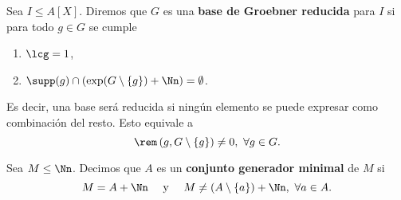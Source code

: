 \begin{definicion}
    Sea $I\le A[X]$. Diremos que $G$ es una \textbf{base de Groebner reducida} para $I$ si para todo $g\in G$ se cumple
    \begin{enumerate}
        \item $\lcg=1$,
        \item $\supp(g) \cap \left(\exp(G\setminus\{g\}) + \Nn \right) = \emptyset$.
    \end{enumerate}
    Es decir, una base será reducida si ningún elemento se puede expresar como combinación del resto. Esto equivale a 
    \begin{equation*}
        \rem\left(g, G\setminus \{g\}\right) \neq 0,\ \forall g\in G.
    \end{equation*}
\end{definicion}

\begin{definicion}
    Sea $M\le \Nn$. Decimos que $A$ es un \textbf{conjunto generador minimal} de $M$ si
    \begin{equation*}
        M = A + \Nn \quad \text{ y } \quad M\neq (A\setminus \{a\}) + \Nn,\ \forall a \in A.
    \end{equation*}
\end{definicion}

